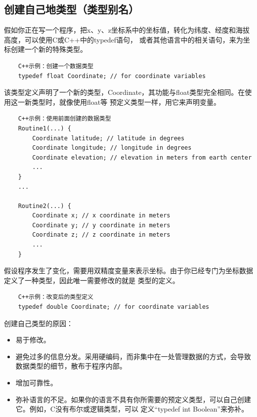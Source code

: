 \documentclass{article}
\begin{document}
\subsection{创建自己地类型（类型别名）}
假如你正在写一个程序，把x、y、z坐标系中的坐标值，转化为纬度、经度和海拔高度，可以使用C或C++中的typedef语句，
或者其他语言中的相关语句，来为坐标创建一个新的特殊类型。
\begin{lstlisting}
    C++示例：创建一个数据类型
    typedef float Coordinate; // for coordinate variables
\end{lstlisting}
该类型定义声明了一个新的类型，Coordinate，其功能与float类型完全相同。在使用这一新类型时，就像使用float等
预定义类型一样，用它来声明变量。
\begin{lstlisting}
    C++示例：使用前面创建的数据类型
    Routine1(...) {
        Coordinate latitude; // latitude in degrees
        Coordinate longitude; // longitude in degrees
        Coordinate elevation; // elevation in meters from earth center
        ...
    }
    ...

    Routine2(...) {
        Coordinate x; // x coordinate in meters
        Coordinate y; // y coordinate in meters
        Coordinate z; // z coordinate in meters
        ...
    }
\end{lstlisting}
假设程序发生了变化，需要用双精度变量来表示坐标。由于你已经专门为坐标数据定义了一种类型，因此唯一需要修改的就是
类型的定义。
\begin{lstlisting}
    C++示例：改变后的类型定义
    typedef double Coordinate; // for coordinate variables
\end{lstlisting}

创建自己类型的原因：
\begin{itemize}
    \item 易于修改。
    \item 避免过多的信息分发。采用硬编码，而非集中在一处管理数据的方式，会导致数据类型的细节，散布于程序内部。
    \item 增加可靠性。
    \item 弥补语言的不足。如果你的语言不具有你所需要的预定义类型，可以自己创建它。例如，C没有布尔或逻辑类型，可以
    定义“typedef int Boolean”来弥补。
\end{itemize}
\end{document}
